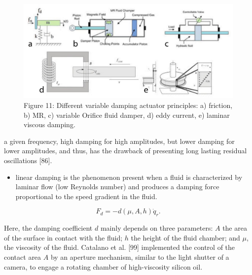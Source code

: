 \documentclass[10pt]{article}
\begin{document}
\begin{figure}[h]
\begin{center}
  \includegraphics[width=\textwidth]{2025_09_17_f0417c8723605e4ad1efg-24}
\captionsetup{labelformat=empty}
\caption{Figure 11: Different variable damping actuator principles: a) friction, b) MR, c) variable Orifice fluid damper, d) eddy current, e) laminar viscous damping.}
\end{center}
\end{figure}

a given frequency, high damping for high amplitudes, but lower damping for lower amplitudes, and thus, has the drawback of presenting long lasting residual oscillations [86].

\begin{itemize}
  \item linear damping is the phenomenon present when a fluid is characterized by laminar flow (low Reynolds number) and produces a damping force proportional to the speed gradient in the fluid.
\end{itemize}


\begin{equation*}
F_{d}=-d(\mu, A, h) \dot{q}_{r} . \tag{6}
\end{equation*}


Here, the damping coefficient $d$ mainly depends on three parameters: $A$ the area of the surface in contact with the fluid; $h$ the height of the fluid chamber; and $\mu$, the viscosity of the fluid. Catalano et al. [99] implemented the control of the contact area $A$ by an aperture mechanism, similar to the light shutter of a camera, to engage a rotating chamber of high-viscosity silicon oil.
\end{document}
